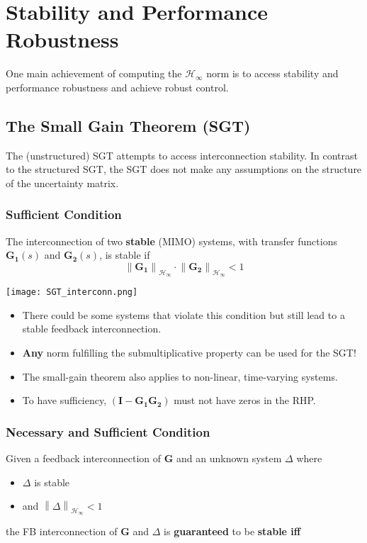 \section{Stability and Performance Robustness}
One main achievement of computing the $\mathcal{H}_\infty$ norm is to access stability and performance robustness and achieve robust control.
\subsection{The Small Gain Theorem (SGT)}
The (unstructured) SGT attempts to access interconnection stability. In contrast to the structured SGT, the SGT does not make any assumptions on the structure of the uncertainty matrix.

\subsubsection{Sufficient Condition}

The interconnection of two \textbf{stable} (MIMO) systems, with transfer functions $\mathbf{G_1}(s)$ and $\mathbf{G_2}(s)$, is stable if
\begin{equation*}
    \left\|\mathbf{G_1}\right\|_{\mathcal{H}_\infty}\cdot\left\|\mathbf{G_2}\right\|_{\mathcal{H}_\infty}<1
\end{equation*}
\begin{center}
    \texttt{[image: SGT\_interconn.png]}
\end{center}

\begin{itemize}
    \item There could be some systems that violate this condition but still lead to a stable feedback interconnection.
    \item \textbf{Any} norm fulfilling the submultiplicative property can be used for the SGT!
    \item The small-gain theorem also applies to non-linear, time-varying systems.
    \item To have sufficiency, $(\mathbf{I}-\mathbf{G_1G_2})$ must not have zeros in the RHP.
\end{itemize}

\subsubsection{Necessary and Sufficient Condition}
Given a feedback interconnection of $\mathbf{G}$ and an unknown system $\Delta$ where
\begin{itemize}
    \item $\Delta$ is stable
    \item and $\left\|\Delta\right\|_{\mathcal{H}_\infty}<1$
\end{itemize}
the FB interconnection of $\mathbf{G}$ and $\Delta$ is \textbf{guaranteed} to be \textbf{stable iff}

